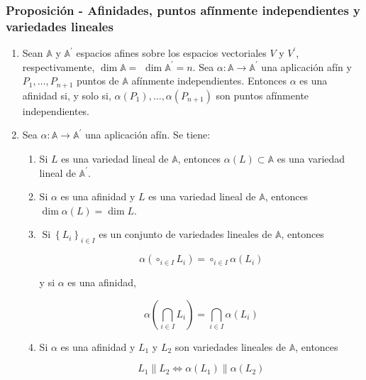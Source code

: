 \documentclass[12pt, a4paper, ones, notitlepage, openany,titlepage]{article}
\begin{document}
\subsubsection{Proposición - Afinidades, puntos afínmente independientes y variedades lineales}
\begin{enumerate}
	\item Sean $\mathbb{A}$ y $\mathbb{A}^{\prime}$ espacios afines sobre los espacios vectoriales $V$ y $V^{\prime}$, respectivamente, $\dim  \mathbb{A}=$ $\dim  \mathbb{A}^{\prime}=n$. Sea $\alpha: \mathbb{A} \rightarrow \mathbb{A}^{\prime}$ una aplicación afín y $P_{1}, \ldots, P_{n+1}$ puntos de $\mathbb{A}$ afínmente independientes. Entonces $\alpha$ es una afinidad si, y solo si, $\alpha\left(P_{1}\right), \ldots, \alpha\left(P_{n+1}\right)$ son puntos afínmente independientes.
	
	\item Sea $\alpha: \mathbb{A} \rightarrow \mathbb{A}^{\prime}$ una aplicación afín. Se tiene:
	\begin{enumerate}
		\item Si $L$ es una variedad lineal de $\mathbb{A}$, entonces $\alpha(L)\subset\mathbb{A}$ es una variedad lineal de $\mathbb{A}^{\prime}$.
		
		\item Si $\alpha$ es una afinidad y $L$ es una variedad lineal de $\mathbb{A}$, entonces $\dim  \alpha(L)=\dim  L$.
		
		\item $\operatorname{Si}\left\{L_{i}\right\}_{i \in I}$ es un conjunto de variedades lineales de $\mathbb{A}$, entonces
		
		$$
		\alpha\left(\circ_{i \in I} L_{i}\right)=\circ_{i \in I} \alpha\left(L_{i}\right)
		$$
		
		y si $\alpha$ es una afinidad,
		
		$$
		\alpha\left(\bigcap_{i \in I} L_{i}\right)=\bigcap_{i \in I} \alpha\left(L_{i}\right)
		$$
		
		\item Si $\alpha$ es una afinidad y $L_{1}$ y $L_{2}$ son variedades lineales de $\mathbb{A}$, entonces
		
		$$
		L_{1}\left\|L_{2} \Longleftrightarrow \alpha\left(L_{1}\right)\right\| \alpha\left(L_{2}\right)
		$$
	\end{enumerate}
\end{enumerate}
\end{document}
